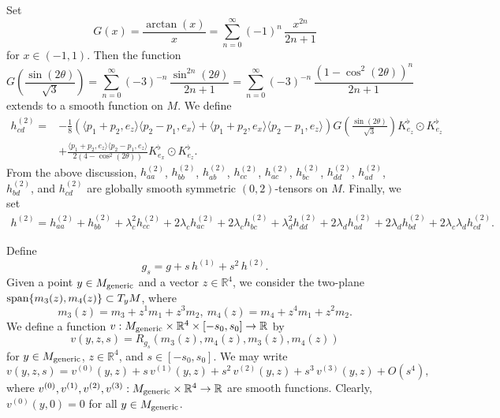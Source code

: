 \documentclass[11pt]{amsart}
\theoremstyle{definition}
\begin{document}
Set 
\[G(x) = \frac{\arctan(x)}{x} = \sum_{n=0}^\infty (-1)^n \, \frac{x^{2n}}{2n+1}\] 
for $x \in (-1,1)$. Then the function 
\[G\left( \frac{\sin(2\theta)}{\sqrt{3}} \right) = \sum_{n=0}^\infty (-3)^{-n} \, \frac{\sin^{2n}(2\theta)}{2n+1} = \sum_{n=0}^\infty (-3)^{-n} \, \frac{(1-\cos^2(2\theta))^n}{2n+1}\] 
extends to a smooth function on $M$. We define
\begin{equation*}\label{def.hcd}
\begin{split}
h^{(2)}_{cd}=&-\frac{1}{8} ( \langle p_1+p_2,e_z  \rangle\langle p_2-p_1,e_x  \rangle+\langle p_1+p_2,e_x  \rangle\langle p_2-p_1,e_z  \rangle   )G\left( \frac{\sin(2\theta)}{\sqrt{3}} \right) K^\flat_{e_z}\odot K^\flat_{e_z}\\
&+\frac{\langle p_1+p_2,e_z  \rangle\langle p_2-p_1,e_z  \rangle}{2(4-\cos^2(2\theta))}K^\flat_{e_x}\odot K^\flat_{e_z}.
\end{split}
\end{equation*}
From the above discussion, $h^{(2)}_{aa}$, $h^{(2)}_{bb}$, $h^{(2)}_{ab}$, $h^{(2)}_{cc}$, $h^{(2)}_{ac}$, $h^{(2)}_{bc}$, $h^{(2)}_{dd}$, $h^{(2)}_{ad}$, $h^{(2)}_{bd}$, and $h^{(2)}_{cd}$ are globally smooth symmetric $(0,2)$-tensors on $M$.
Finally, we set
\begin{equation}\label{def.h2}
\begin{split}
h^{(2)}=h^{(2)}_{aa}+
h^{(2)}_{bb}+
\lambda_c^2h^{(2)}_{cc}+
2\lambda_c h^{(2)}_{ac}+
2\lambda_c h^{(2)}_{bc}+
\lambda_d^2 h^{(2)}_{dd}+
2\lambda_d h^{(2)}_{ad}+
2\lambda_d h^{(2)}_{bd}+
2\lambda_c\lambda_d h^{(2)}_{cd}.
\end{split}
\end{equation}



Define 
\[g_s = g + s \, h^{(1)} + s^2 \, h^{(2)}.\] 
Given a point $y \in M_{\text{\rm generic}}$ and a vector $z \in \mathbb{R}^4$, we consider the two-plane $\text{\rm span}\{m_3(z),m_4(z)\} \subset T_y M$, where 
\[ m_3(z)=m_3+z^1 m_1+z^3 m_2,\ m_4(z)=m_4+z^4 m_1+z^2 m_2. \] 
We define a function $v: M_{\text{\rm generic}} \times \mathbb{R}^4 \times [-s_0,s_0] \to \mathbb{R}$ by 
\[v(y,z,s) = R_{g_s}(m_3(z),m_4(z),m_3(z),m_4(z))\] 
for $y \in M_{\text{\rm generic}}$, $z \in \mathbb{R}^4$, and $s \in [-s_0,s_0]$. We may write 
\begin{equation} 
\label{Taylor.expansion.of.v}
v(y,z,s) = v^{(0)}(y,z) + s \, v^{(1)}(y,z) + s^2 \, v^{(2)}(y,z) + s^3 \, v^{(3)}(y,z) + O(s^4), 
\end{equation}
where $v^{(0)},v^{(1)},v^{(2)},v^{(3)}: M_{\text{\rm generic}} \times \mathbb{R}^4 \to \mathbb{R}$ are smooth functions. Clearly, $v^{(0)}(y,0) = 0$ for all $y \in M_{\text{\rm generic}}$.
\end{document}
